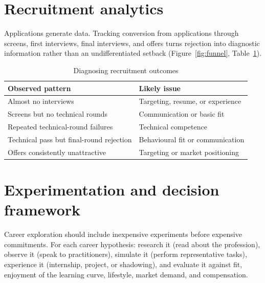 \documentclass{reportkit}
\begin{document}
\section{Recruitment analytics}
Applications generate data. Tracking conversion from applications through screens,
first interviews, final interviews, and offers turns rejection into diagnostic
information rather than an undifferentiated setback (Figure~\ref{fig:funnel},
Table~\ref{tab:diagnosis}).

\begin{diagram}[
  type=funnel,
  caption={Recruitment conversion narrows at every stage.},
  label={fig:funnel},
  source={Illustrative shape; a real analysis should use the student's own tracked conversion counts.},
  description={Five tapering stages: applications, screens, first interviews, final interviews, and offers.}
]
\end{diagram}

\begin{table}[H]
\caption{Diagnosing recruitment outcomes}
\label{tab:diagnosis}
\centering
\begin{tabular}{lp{7cm}}
\toprule
Observed pattern & Likely issue \\
\midrule
Almost no interviews & Targeting, resume, or experience \\
Screens but no technical rounds & Communication or basic fit \\
Repeated technical-round failures & Technical competence \\
Technical pass but final-round rejection & Behavioural fit or communication \\
Offers consistently unattractive & Targeting or market positioning \\
\bottomrule
\end{tabular}
\end{table}

\section{Experimentation and decision framework}
Career exploration should include inexpensive experiments before expensive
commitments. For each career hypothesis: research it (read about the profession),
observe it (speak to practitioners), simulate it (perform representative tasks),
experience it (internship, project, or shadowing), and evaluate it against fit,
enjoyment of the learning curve, lifestyle, market demand, and compensation.
\end{document}
